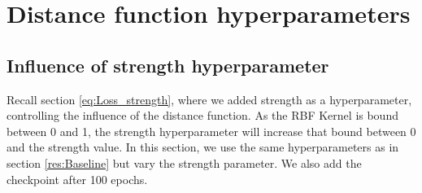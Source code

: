 \section{Distance function hyperparameters}\label{res:Hyperparameters}
\subsection{Influence of strength hyperparameter}\label{res:Strength}

Recall section \ref{eq:Loss_strength}, where we added strength as a
hyperparameter, controlling the influence of the distance function. As the RBF
Kernel is bound between 0 and 1, the strength hyperparameter will increase that
bound between 0 and the strength value. In this section, we use the same
hyperparameters as in section \ref{res:Baseline} but vary the strength
parameter. We also add the checkpoint after 100 epochs.

